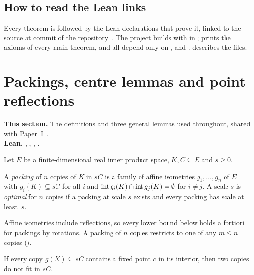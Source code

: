 \documentclass[11pt,a4paper]{article}
\begin{document}
\subsection{How to read the Lean links}
Every theorem is followed by the Lean declarations that prove it, linked to the source at commit \href{\repo/tree/\leancommit}{\texttt{\leancommitshort}} of the repository~\cite{archive}. The project builds with  in ;  prints the axioms of every main theorem, and all depend only on ,  and .  describes the files.

\section{Packings, centre lemmas and point reflections}\label{sec:setting}

\begin{summarybox}
\textbf{This section.} The definitions and three general lemmas used throughout, shared with Paper~I~\cite{cubecentre}.\\
\textbf{Lean.} , , , .
\end{summarybox}

Let $E$ be a finite-dimensional real inner product space, $K,C\subseteq E$ and $s\ge0$.

\begin{definition}
A \emph{packing} of $n$ copies of $K$ in $sC$ is a family of affine isometries $g_1,\dots,g_n$ of $E$ with $g_i(K)\subseteq sC$ for all $i$ and $\operatorname{int} g_i(K)\cap\operatorname{int} g_j(K)=\emptyset$ for $i\ne j$. A scale $s$ is \emph{optimal} for $n$ copies if a packing at scale $s$ exists and every packing has scale at least~$s$.
\end{definition}

Affine isometries include reflections, so every lower bound below holds a fortiori for packings by rotations. A packing of $n$ copies restricts to one of any $m\le n$ copies ().

\begin{lemma}\label{lem:common}
If every copy $g(K)\subseteq sC$ contains a fixed point $c$ in its interior, then two copies do not fit in $sC$.
\end{lemma}
\end{document}
